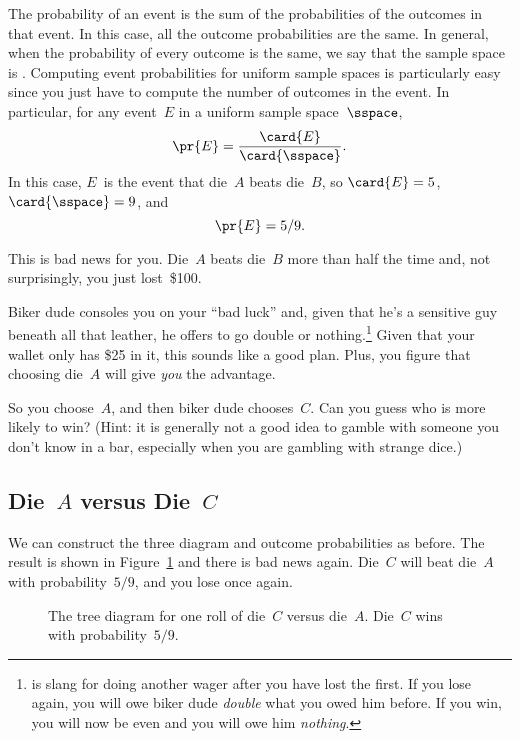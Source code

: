 The probability of an event is the sum of the probabilities of the
outcomes in that event.  In this case, all the outcome probabilities
are the same.  In general, when the probability of every outcome is
the same, we say that the sample space is .  Computing
event probabilities for uniform sample spaces is particularly easy
since you just have to compute the number of outcomes in the event.
In particular, for any event~$E$ in a uniform sample space~$\sspace$,
\begin{equation}\label{eqn:14F1}
    \pr{E} = \frac{\card{E}}{\card{\sspace}}.
\end{equation}
In this case, $E$~is the event that die~$A$ beats die~$B$, so
$\card{E} = 5$, \ $\card{\sspace} = 9$, and
\begin{equation*}
    \pr{E} = 5/9.
\end{equation*}

This is bad news for you.  Die~$A$ beats die~$B$ more than half the
time and, not surprisingly, you just lost~\$100.

Biker dude consoles you on your ``bad luck'' and, given that he's a
sensitive guy beneath all that leather, he offers to go double or
nothing.\footnote{ is slang for doing another
  wager after you have lost the first.  If you lose again, you will
  owe biker dude \emph{double} what you owed him before.  If you win,
  you will now be even and you will owe him \emph{nothing}.}  Given
that your wallet only has \$25 in it, this sounds like a good plan.
Plus, you figure that choosing die~$A$ will give \emph{you} the
advantage.

So you choose~$A$, and then biker dude chooses~$C$.  Can you guess who
is more likely to win?  (Hint: it is generally not a good idea to
gamble with someone you don't know in a bar, especially when you are
gambling with strange dice.)

\subsection{Die~$A$ versus Die~$C$}

We can construct the three diagram and outcome probabilities as
before.  The result is shown in Figure~\ref{fig:14A9} and there is bad
news again.  Die~$C$ will beat die~$A$ with probability~$5/9$, and you
lose once again.

\begin{figure}


\caption{The tree diagram for one roll of die~$C$ versus die~$A$.
  Die~$C$ wins with probability~$5/9$.}

\label{fig:14A9}

\end{figure}

